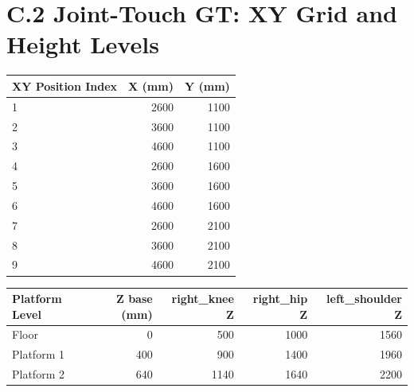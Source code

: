 \endgroup

\section*{C.2 Joint-Touch GT: XY Grid and Height Levels}

\begingroup
\singlespacing
\small
\setlength{\tabcolsep}{5pt}
\renewcommand{\arraystretch}{0.95}
\begin{center}
\label{tab:app_c_joint_xy}
\begin{tabular}{|l|r|r|}
\hline
\textbf{XY Position Index} & \textbf{X (mm)} & \textbf{Y (mm)} \\
\hline
1 & 2600 & 1100 \\
\hline
2 & 3600 & 1100 \\
\hline
3 & 4600 & 1100 \\
\hline
4 & 2600 & 1600 \\
\hline
5 & 3600 & 1600 \\
\hline
6 & 4600 & 1600 \\
\hline
7 & 2600 & 2100 \\
\hline
8 & 3600 & 2100 \\
\hline
9 & 4600 & 2100 \\
\hline
\end{tabular}
\end{center}

\begin{center}
\label{tab:app_c_joint_heights}
\begin{tabular}{|l|r|r|r|r|}
\hline
\textbf{Platform Level} & \textbf{Z base (mm)} & \textbf{right\_knee Z} & \textbf{right\_hip Z} & \textbf{left\_shoulder Z} \\
\hline
Floor & 0 & 500 & 1000 & 1560 \\
\hline
Platform 1 & 400 & 900 & 1400 & 1960 \\
\hline
Platform 2 & 640 & 1140 & 1640 & 2200 \\
\hline
\end{tabular}
\end{center}
\endgroup
